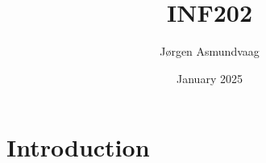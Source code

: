 \documentclass{article}
\title{INF202}
\author{Jørgen Asmundvaag}
\date{January 2025}
\begin{document}
\maketitle

\section{Introduction}
\section{}
\end{document}

